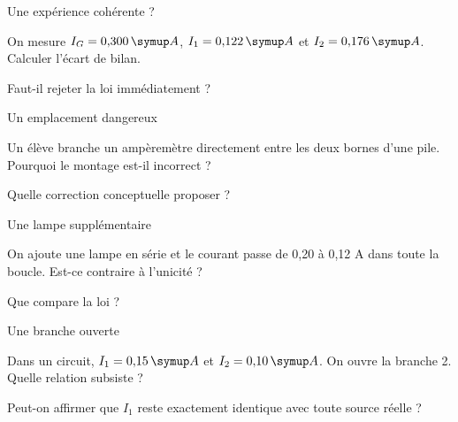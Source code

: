 \clearpage{}
\par\noindent\begin{minipage}{\linewidth}
\begin{exercice}[3]{Une expérience cohérente ?}
\begin{questions}
\item On mesure $I_G=0{,}300\unite A$, $I_1=0{,}122\unite A$ et $I_2=0{,}176\unite A$. Calculer l’écart de bilan.
\item Faut-il rejeter la loi immédiatement ?
\end{questions}
\end{exercice}
\end{minipage}
\par\noindent\begin{minipage}{\linewidth}
\begin{exercice}[3]{Un emplacement dangereux}
\begin{questions}
\item Un élève branche un ampèremètre directement entre les deux bornes d’une pile. Pourquoi le montage est-il incorrect ?
\item Quelle correction conceptuelle proposer ?
\end{questions}
\end{exercice}
\end{minipage}
\par\noindent\begin{minipage}{\linewidth}
\begin{exercice}[3]{Une lampe supplémentaire}
\begin{questions}
\item On ajoute une lampe en série et le courant passe de 0,20 à 0,12 A dans toute la boucle. Est-ce contraire à l’unicité ?
\item Que compare la loi ?
\end{questions}
\end{exercice}
\end{minipage}
\par\noindent\begin{minipage}{\linewidth}
\begin{exercice}[3]{Une branche ouverte}
\begin{questions}
\item Dans un circuit, $I_1=0{,}15\unite A$ et $I_2=0{,}10\unite A$. On ouvre la branche 2. Quelle relation subsiste ?
\item Peut-on affirmer que $I_1$ reste exactement identique avec toute source réelle ?
\end{questions}
\end{exercice}
\end{minipage}
